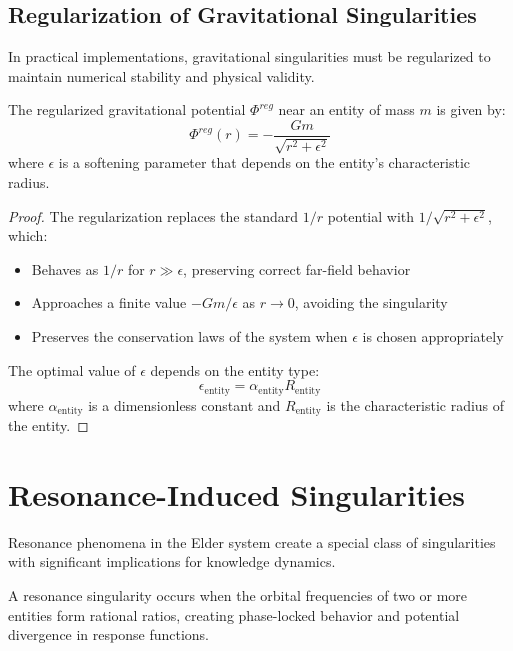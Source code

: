 \subsection{Regularization of Gravitational Singularities}

In practical implementations, gravitational singularities must be regularized to maintain numerical stability and physical validity.

\begin{theorem}
The regularized gravitational potential $\Phi^{reg}$ near an entity of mass $m$ is given by:
\begin{equation}
\Phi^{reg}(r) = -\frac{Gm}{\sqrt{r^2 + \epsilon^2}}
\end{equation}
where $\epsilon$ is a softening parameter that depends on the entity's characteristic radius.
\end{theorem}

\begin{proof}
The regularization replaces the standard $1/r$ potential with $1/\sqrt{r^2 + \epsilon^2}$, which:
\begin{itemize}
    \item Behaves as $1/r$ for $r \gg \epsilon$, preserving correct far-field behavior
    \item Approaches a finite value $-Gm/\epsilon$ as $r \to 0$, avoiding the singularity
    \item Preserves the conservation laws of the system when $\epsilon$ is chosen appropriately
\end{itemize}

The optimal value of $\epsilon$ depends on the entity type:
\begin{equation}
\epsilon_{\text{entity}} = \alpha_{\text{entity}} R_{\text{entity}}
\end{equation}
where $\alpha_{\text{entity}}$ is a dimensionless constant and $R_{\text{entity}}$ is the characteristic radius of the entity.
\end{proof}

\section{Resonance-Induced Singularities}

Resonance phenomena in the Elder system create a special class of singularities with significant implications for knowledge dynamics.

\begin{definition}
A resonance singularity occurs when the orbital frequencies of two or more entities form rational ratios, creating phase-locked behavior and potential divergence in response functions.
\end{definition}

